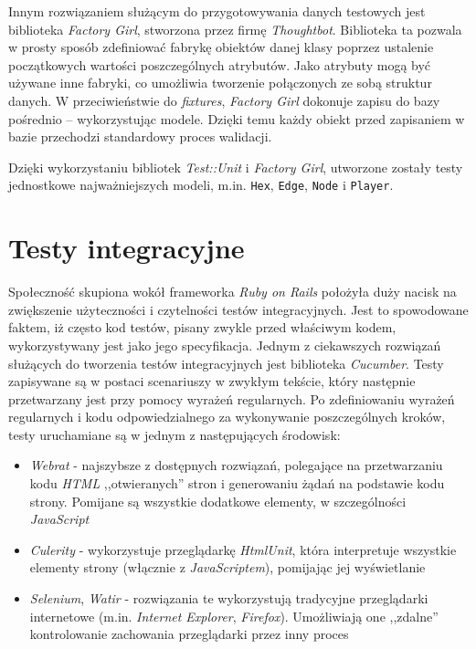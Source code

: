 \documentclass[11pt,twoside]{report}
\begin{document}
Innym rozwiązaniem służącym do przygotowywania danych testowych jest
biblioteka \emph{Factory Girl}, stworzona przez firmę
\emph{Thoughtbot}. Biblioteka ta pozwala w prosty sposób zdefiniować
fabrykę obiektów danej klasy poprzez ustalenie początkowych wartości
poszczególnych atrybutów. Jako atrybuty mogą być używane inne fabryki,
co umożliwia tworzenie połączonych ze sobą struktur danych. W
przeciwieństwie do \emph{fixtures}, \emph{Factory Girl} dokonuje
zapisu do bazy pośrednio -- wykorzystując modele. Dzięki temu każdy
obiekt przed zapisaniem w bazie przechodzi standardowy proces
walidacji.

Dzięki wykorzystaniu bibliotek \emph{Test::Unit} i \emph{Factory Girl},
utworzone zostały testy jednostkowe najważniejszych modeli,
m.in. \texttt{Hex}, \texttt{Edge}, \texttt{Node} i \texttt{Player}.

\section{Testy integracyjne}
Społeczność skupiona wokół frameworka \emph{Ruby on Rails} położyła
duży nacisk na zwiększenie użyteczności i czytelności testów
integracyjnych. Jest to spowodowane faktem, iż często kod testów,
pisany zwykle przed właściwym kodem, wykorzystywany jest jako jego
specyfikacja. Jednym z ciekawszych rozwiązań służących do tworzenia
testów integracyjnych jest biblioteka \emph{Cucumber}. Testy
zapisywane są w postaci scenariuszy w zwykłym tekście, który następnie
przetwarzany jest przy pomocy wyrażeń regularnych. Po zdefiniowaniu
wyrażeń regularnych i kodu odpowiedzialnego za wykonywanie
poszczególnych kroków, testy uruchamiane są w jednym z następujących
środowisk:

\begin{itemize}
\item \emph{Webrat} - najszybsze z dostępnych rozwiązań, polegające na
  przetwarzaniu kodu \emph{HTML} ,,otwieranych'' stron i generowaniu
  żądań na podstawie kodu strony. Pomijane są wszystkie dodatkowe
  elementy, w szczególności \emph{JavaScript}
\item \emph{Culerity} - wykorzystuje przeglądarkę \emph{HtmlUnit},
  która interpretuje wszystkie elementy strony (włącznie z
  \emph{JavaScriptem}), pomijając jej wyświetlanie
\item \emph{Selenium}, \emph{Watir} - rozwiązania te wykorzystują
  tradycyjne przeglądarki internetowe (m.in. \emph{Internet Explorer},
  \emph{Firefox}). Umożliwiają one ,,zdalne'' kontrolowanie zachowania
  przeglądarki przez inny proces
\end{itemize}
\end{document}
